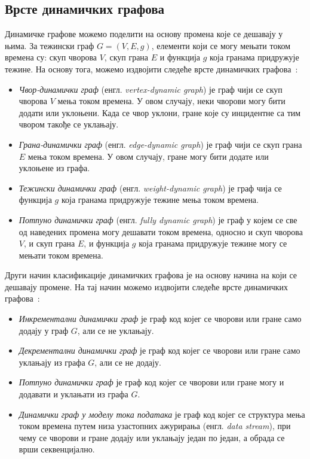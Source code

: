 \subsection{Врсте динамичких графова}

Динамичке графове можемо поделити на основу промена које се дешавају у њима. За тежински граф $G=(V,E,g)$, елементи који се могу мењати током времена су: скуп чворова $V$, скуп грана $E$ и функција $g$ која гранама придружује тежине. На основу тога, можемо издвојити следеће врсте динамичких графова~\cite{HARARY199779}:

\begin{itemize}
    \item \textit{Чвор-динамички граф} (енгл. \textit{vertex-dynamic graph}) је граф чији се скуп чворова $V$ мења током времена. У овом случају, неки чворови могу бити додати или уклоњени. Када се чвор уклони, гране које су инцидентне са тим чвором такође се уклањају.
    \item \textit{Грана-динамички граф} (енгл. \textit{edge-dynamic graph}) је граф чији се скуп грана $E$ мења током времена. У овом случају, гране могу бити додате или уклоњене из графа.
    \item \textit{Тежински динамички граф} (енгл. \textit{weight-dynamic graph}) је граф чија се функција $g$ која гранама придружује тежине мења током времена.
    \item \textit{Потпуно динамички граф} (енгл. \textit{fully dynamic graph}) је граф у којем се све од наведених промена могу дешавати током времена, односно и скуп чворова $V$, и скуп грана $E$, и функција $g$ која гранама придружује тежине могу се мењати током времена.
\end{itemize}

Други начин класификације динамичких графова је на основу начина на који се дешавају промене. На тај начин можемо издвојити следеће врсте динамичких графова~\cite{dynamic_graph_processing_survey}:

\begin{itemize}
    \item \textit{Инкрементални динамички граф} је граф код којег се чворови или гране само додају у граф $G$, али се не уклањају.
    \item \textit{Декрементални динамички граф} је граф код којег се чворови или гране само уклањају из графа $G$, али се не додају.
    \item \textit{Потпуно динамички граф} је граф код којег се чворови или гране могу и додавати и уклањати из графа $G$.
    \item \textit{Динамички граф у моделу тока података} је граф код којег се структура мења током времена путем низа узастопних ажурирања (енгл. \textit{data stream}), при чему се чворови и гране додају или уклањају један по један, а обрада се врши секвенцијално.
\end{itemize}

